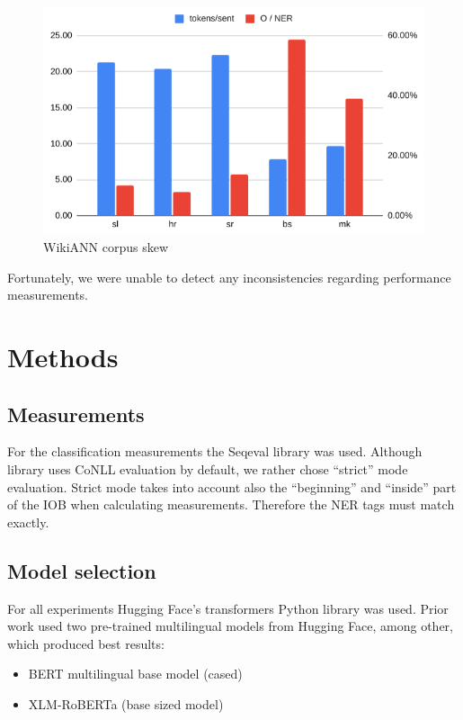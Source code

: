\documentclass[sigconf]{acmart}
\begin{document}
\begin{figure}[h]
  \caption{WikiANN corpus skew}
  \label{fig:corpora_analysis}
  \centering
  \includegraphics[width=\linewidth]{wikiann-skew}
\end{figure}

Fortunately, we were unable to detect any inconsistencies regarding performance measurements.

\section{Methods}
\label{sec:methods}

\subsection{Measurements}
\label{subsec:measurements}
For the classification measurements the Seqeval library\cite{seqeval} was used.
Although library uses CoNLL evaluation by default, we rather chose ``strict'' mode evaluation.
Strict mode takes into account also the ``beginning'' and ``inside'' part of the IOB when calculating measurements.
Therefore the NER tags must match exactly.

\subsection{Model selection}
\label{subsec:model-selection}
For all experiments Hugging Face's transformers Python library\cite{wolf-etal-2020-transformers} was used.
Prior work used two pre-trained multilingual models from Hugging Face, among other, which produced best results:
\begin{itemize}
  \item BERT multilingual base model (cased)\cite{DBLP:journals/corr/abs-1810-04805}
  \item XLM-RoBERTa (base sized model)\cite{DBLP:journals/corr/abs-1911-02116}
\end{itemize}
\end{document}
